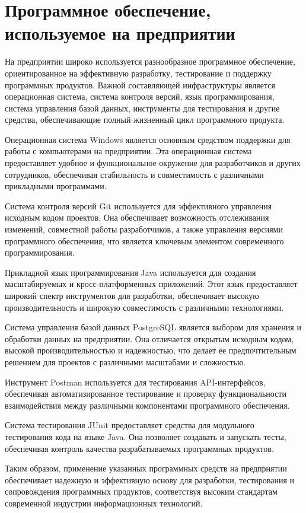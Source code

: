 \documentclass[12pt,a4paper,draft]{belgost/belgost}
\begin{document}
\chapter{Программное обеспечение, используемое на предприятии}

На предприятии широко используется разнообразное программное обеспечение, ориентированное на эффективную разработку, тестирование и поддержку программных продуктов.
Важной составляющей инфраструктуры является операционная система, система контроля версий, язык программирования, система управления базой данных, инструменты для тестирования и другие средства, обеспечивающие полный жизненный цикл программного продукта.

Операционная система Windows является основным средством поддержки для работы с компьютерами на предприятии.
Эта операционная система предоставляет удобное и функциональное окружение для разработчиков и других сотрудников, обеспечивая стабильность и совместимость с различными прикладными программами.

Система контроля версий Git используется для эффективного управления исходным кодом проектов.
Она обеспечивает возможность отслеживания изменений, совместной работы разработчиков, а также управления версиями программного обеспечения, что является ключевым элементом современного программирования.

Прикладной язык программирования Java используется для создания масштабируемых и кросс-платформенных приложений.
Этот язык предоставляет широкий спектр инструментов для разработки, обеспечивает высокую производительность и широкую совместимость с различными технологиями.

Система управления базой данных PostgreSQL является выбором для хранения и обработки данных на предприятии.
Она отличается открытым исходным кодом, высокой производительностью и надежностью, что делает ее предпочтительным решением для проектов с различными масштабами и сложностью.

Инструмент Postman используется для тестирования API-интерфейсов, обеспечивая автоматизированное тестирование и проверку функциональности взаимодействия между различными компонентами программного обеспечения.

Система тестирования JUnit предоставляет средства для модульного тестирования кода на языке Java.
Она позволяет создавать и запускать тесты, обеспечивая контроль качества разрабатываемых программных продуктов.

Таким образом, применение указанных программных средств на предприятии обеспечивает надежную и эффективную основу для разработки, тестирования и сопровождения программных продуктов, соответствуя высоким стандартам современной индустрии информационных технологий.
\end{document}

